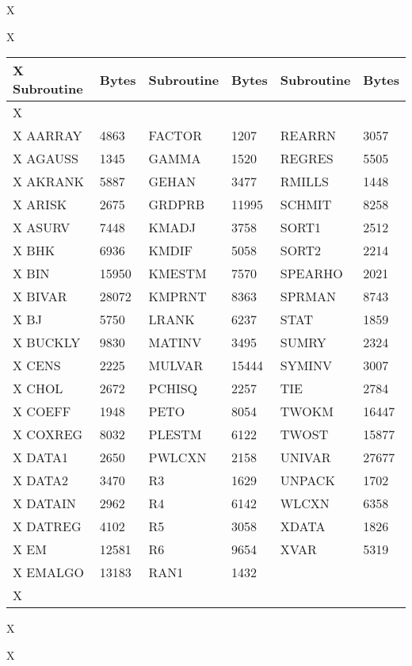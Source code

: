 X\begin{center}
X\begin{tabular}{|ll|ll|ll|} \hline
X   Subroutine & Bytes & Subroutine & Bytes & Subroutine & Bytes  \\ \hline
X&&&&& \\
X                AARRAY &4863 & FACTOR &1207 & REARRN & 3057 \\
X                AGAUSS &1345 & GAMMA &1520 & REGRES & 5505 \\
X                AKRANK &5887 & GEHAN &3477 & RMILLS & 1448 \\
X                ARISK &2675 & GRDPRB &11995 & SCHMIT & 8258\\
X                ASURV &7448 & KMADJ &3758 & SORT1 & 2512\\
X                BHK &6936 & KMDIF &5058 & SORT2 & 2214\\
X                BIN &15950 & KMESTM &7570 & SPEARHO & 2021\\
X                BIVAR &28072 & KMPRNT &8363 & SPRMAN & 8743\\
X                BJ &5750 & LRANK &6237 & STAT & 1859\\
X                BUCKLY &9830 & MATINV &3495 & SUMRY & 2324\\
X                CENS &2225 & MULVAR &15444 & SYMINV & 3007\\
X                CHOL &2672 & PCHISQ &2257 & TIE & 2784\\
X                COEFF &1948 & PETO &8054 & TWOKM & 16447\\
X                COXREG &8032 & PLESTM &6122 & TWOST & 15877\\
X                DATA1 &2650 & PWLCXN &2158 & UNIVAR & 27677\\
X                DATA2 &3470 & R3 &1629 & UNPACK & 1702\\
X                DATAIN &2962 & R4 &6142 & WLCXN & 6358\\
X                DATREG &4102 & R5 &3058 & XDATA & 1826\\
X                EM &12581 & R6 &9654 & XVAR & 5319\\
X                EMALGO &13183 & RAN1 &1432 & &\\ \hline
X\end{tabular}
X\end{center}
X